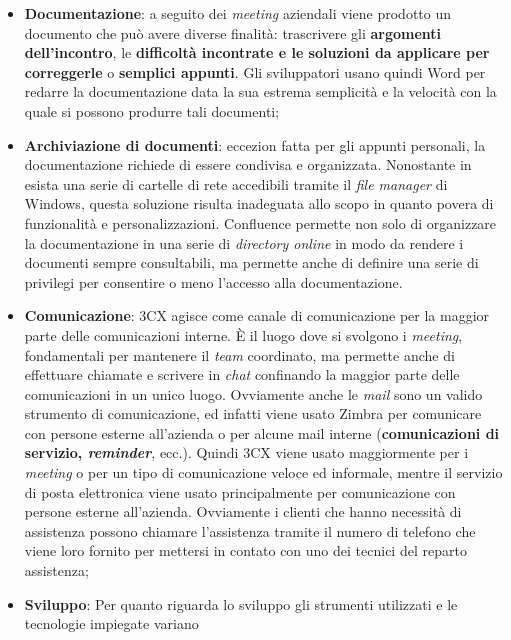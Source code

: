 \begin{itemize}
      \item \textbf{Documentazione}: a seguito dei \textit{meeting} aziendali viene prodotto un documento che può 
            avere diverse finalità: trascrivere gli \textbf{argomenti dell'incontro}, le \textbf{difficoltà incontrate e le soluzioni da 
            applicare per correggerle} o \textbf{semplici appunti}. Gli sviluppatori usano quindi Word per redarre la documentazione 
            data la sua estrema semplicità e la velocità con la quale si possono produrre tali documenti;
      \item \textbf{Archiviazione di documenti}: eccezion fatta per gli appunti personali, la documentazione richiede di 
            essere condivisa e organizzata. Nonostante in {\company} esista una serie di cartelle di rete accedibili tramite 
            il \textit{file manager} di Windows, questa soluzione risulta inadeguata allo scopo in quanto povera di funzionalità 
            e personalizzazioni. Confluence permette non solo di organizzare la documentazione in una serie di \textit{directory 
            online} in modo da rendere i documenti sempre consultabili, ma permette anche di definire una serie di privilegi per 
            consentire o meno l'accesso alla documentazione.
      \item \textbf{Comunicazione}: 3CX agisce come canale di comunicazione per la maggior parte delle comunicazioni interne. 
            È il luogo dove si svolgono i \textit{meeting}, fondamentali per mantenere il \textit{team} coordinato, ma permette 
            anche di effettuare chiamate e scrivere in \textit{chat} confinando la maggior parte delle comunicazioni in un unico 
            luogo. Ovviamente anche le \textit{mail} sono un valido strumento di comunicazione, ed infatti viene usato Zimbra 
            per comunicare con persone esterne all'azienda o per alcune mail interne (\textbf{comunicazioni di servizio, 
            \textit{reminder}}, ecc.). Quindi 3CX viene usato maggiormente per i \textit{meeting} o per un tipo di 
            comunicazione veloce ed informale, mentre il servizio di posta elettronica viene usato principalmente 
            per comunicazione con persone esterne all'azienda. Ovviamente i clienti che hanno necessità di assistenza 
            possono chiamare l'assistenza tramite il numero di telefono che viene loro fornito per mettersi in contato con 
            uno dei tecnici del reparto assistenza;
      \item \textbf{Sviluppo}: Per quanto riguarda lo sviluppo gli strumenti utilizzati e le tecnologie impiegate variano 

\end{itemize}
